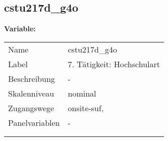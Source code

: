 	
	
	\subsection{cstu217d\_g4o}
	\label{subSection:cstu217d_g4o}

	\noindent\textbf{Variable:}\\
		\begin{tabular}{lL{11.3cm}}
			\label{tableVariable:cstu217d_g4o}
			Name & cstu217d\_g4o \\
			Label & 7. Tätigkeit: Hochschulart \\
			Beschreibung & - \\
			Skalenniveau & nominal \\
			Zugangswege &
				onsite-suf,
 \\
			Panelvariablen & -
			 \\
			 \\
 \\
		\end{tabular}






